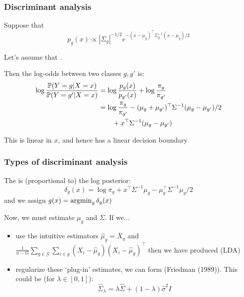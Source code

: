 \documentclass[12pt]{beamer}
\begin{document}
\begin{frame}
\frametitle{Discriminant analysis}
Suppose that
\[
p_g(x) \propto |\Sigma_g|^{-1/2} e^{-(x - \mu_g)^{\top}\Sigma_g^{-1}(x - \mu_g)/2}
\]

Let's assume that . 
\vsp

Then the log-odds between two classes $g,g'$ is:
\begin{align*}
\log \frac{\P(Y = g | X = x)}{\P(Y = g' | X = x) } 
&  = 
\log\frac{p_g(x)}{p_{g'}(x)} + \log \frac{\pi_g}{\pi_{g'}}\\
& = 
\log \frac{\pi_g}{\pi_{g'}} - (\mu_{g} + \mu_{g'})^{\top} \Sigma^{-1} (\mu_g - \mu_{g'})/2  \\
& \qquad+ x^{\top} \Sigma^{-1}(\mu_g - \mu_{g'})
\end{align*}

This is linear in $x$, and hence has a linear decision boundary
\end{frame}

\begin{frame}
\frametitle{Types of discriminant analysis}
The  is (proportional to) the log posterior:
\[
\delta_g(x) = \log \pi_g + x^{\top} \Sigma^{-1}\mu_g  - \mu_{g}^{\top} \Sigma^{-1} \mu_g /2 
\]
and we assign $g(x) = \argmin_g \delta_g(x)$


\vsp
Now, we must estimate $\mu_g$ and $\Sigma$.  If we...
\begin{itemize}
\item use the intuitive estimators $\hat{\mu}_g = \overline{X}_g$ and 
$\frac{1}{n-G} \sum_{g \in \mathcal{G}} \sum_{i \in g} (X_i - \hat{\mu}_g) (X_i - \hat{\mu}_g)^{\top}$ then we have produced  (LDA)
\item regularize these `plug-in' estimates, we can form 
(Friedman (1989)).  This could be (for $\lambda \in [0,1]$):
\[
\hat{\Sigma}_{\lambda} = \lambda \hat{\Sigma} + (1-\lambda) \hat\sigma^2 I
\]
\end{itemize}
\end{frame}
\end{document}
